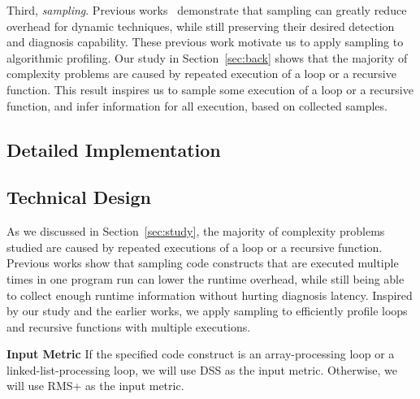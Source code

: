 Third, \textit{sampling}.
Previous works~\cite{liblit03,liblit05,CCI,SongOOPSLA2014,ldoctor}
demonstrate that sampling can greatly 
reduce overhead for dynamic techniques,
while still preserving their desired 
detection and diagnosis capability. 
These previous work motivate us to apply sampling to algorithmic profiling. 
Our study in Section~\ref{sec:back} shows that 
the majority of complexity problems are caused by repeated execution of a loop
or a recursive function. 
This result inspires us to sample some execution of 
a loop or a recursive function,
and infer information for all execution, 
based on collected samples.

\subsection{Detailed Implementation}











\subsection{Technical Design}
As we discussed in Section~\ref{sec:study}, 
the majority of complexity problems studied are caused 
by repeated executions of a loop or a recursive function. 
Previous works show that sampling code constructs that are executed 
multiple times in one program run can lower the runtime overhead, 
while still being able to collect enough runtime information 
without hurting diagnosis latency\cite{SongOOPSLA2014,ldoctor}. 
Inspired by our study and the earlier works, 
we apply sampling to efficiently profile loops 
and recursive functions with multiple executions. 

\noindent\textbf{Input Metric}
If the specified code construct is an array-processing loop 
or a linked-list-processing loop,
we will use DSS as the input metric. 
Otherwise, we will use RMS+ as the input metric. 

